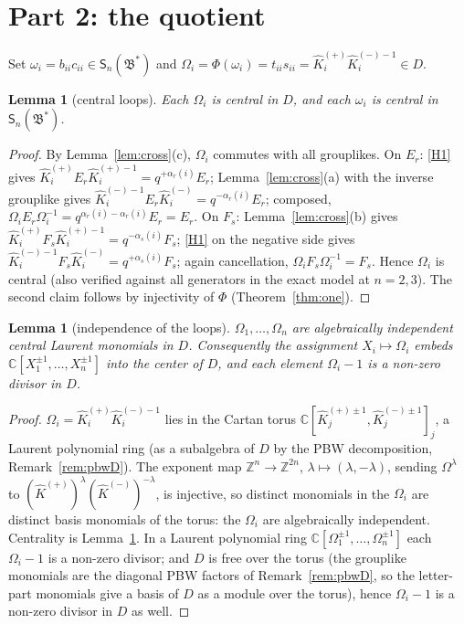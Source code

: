 \documentclass[11pt]{article}
\newtheorem{lemma}[theorem]{Lemma}
\theoremstyle{definition}
\theoremstyle{remark}
\newcommand{\C}{\mathbb{C}}
\newcommand{\Z}{\mathbb{Z}}
\newcommand{\B}{\mathfrak{B}}
\newcommand{\Sn}{\mathsf{S}_n}
\newcommand{\hK}{\hat K}
\begin{document}
\section{Part 2: the quotient}\label{sec:p2}

Set $\omega_i=b_{ii}c_{ii}\in\Sn(\B^*)$ and
$\Omega_i=\Phi(\omega_i)=t_{ii}s_{ii}=\hK_i^{(+)}\hK_i^{(-)-1}\in D$.

\begin{lemma}[central loops]\label{lem:loops}
Each $\Omega_i$ is central in $D$, and each $\omega_i$ is central in
$\Sn(\B^*)$.
\end{lemma}
\begin{proof}
By Lemma~\ref{lem:cross}(c), $\Omega_i$ commutes with all grouplikes.
On $E_r$: \eqref{H1} gives
$\hK_i^{(+)}E_r\hK_i^{(+)-1}=q^{+\alpha_r(i)}E_r$;
Lemma~\ref{lem:cross}(a) with the inverse grouplike gives
$\hK_i^{(-)-1}E_r\hK_i^{(-)}=q^{-\alpha_r(i)}E_r$; composed,
$\Omega_iE_r\Omega_i^{-1}=q^{\alpha_r(i)-\alpha_r(i)}E_r=E_r$.
On $F_s$: Lemma~\ref{lem:cross}(b) gives
$\hK_i^{(+)}F_s\hK_i^{(+)-1}=q^{-\alpha_s(i)}F_s$; \eqref{H1} on the
negative side gives
$\hK_i^{(-)-1}F_s\hK_i^{(-)}=q^{+\alpha_s(i)}F_s$; again cancellation,
$\Omega_iF_s\Omega_i^{-1}=F_s$.  Hence $\Omega_i$ is central
(also verified against all generators in the exact model at $n=2,3$).
The second claim follows by injectivity of $\Phi$
(Theorem~\ref{thm:one}).
\end{proof}

\begin{lemma}[independence of the loops]\label{lem:split}
$\Omega_1,\dots,\Omega_n$ are algebraically independent central
Laurent monomials in $D$.  Consequently the assignment
$X_i\mapsto\Omega_i$ embeds $\C[X_1^{\pm1},\dots,X_n^{\pm1}]$ into
the center of $D$, and each element $\Omega_i-1$ is a non-zero
divisor in $D$.
\end{lemma}
\begin{proof}
$\Omega_i=\hK_i^{(+)}\hK_i^{(-)-1}$ lies in the Cartan torus
$\C[\hK_j^{(+)\pm1},\hK_j^{(-)\pm1}]_j$, a Laurent polynomial ring
(as a subalgebra of $D$ by the PBW decomposition,
Remark~\ref{rem:pbwD}).  The exponent map
$\Z^n\to\Z^{2n}$, $\lambda\mapsto(\lambda,-\lambda)$, sending
$\Omega^\lambda$ to $(\hK^{(+)})^\lambda(\hK^{(-)})^{-\lambda}$, is
injective, so distinct monomials in the $\Omega_i$ are distinct
basis monomials of the torus: the $\Omega_i$ are algebraically
independent.  Centrality is Lemma~\ref{lem:loops}.  In a Laurent
polynomial ring $\C[\Omega_1^{\pm1},\dots,\Omega_n^{\pm1}]$ each
$\Omega_i-1$ is a non-zero divisor; and $D$ is free over the torus
(the grouplike monomials are the diagonal PBW factors of
Remark~\ref{rem:pbwD}, so the letter-part monomials give a basis of
$D$ as a module over the torus), hence $\Omega_i-1$ is a non-zero
divisor in $D$ as well.
\end{proof}
\end{document}
